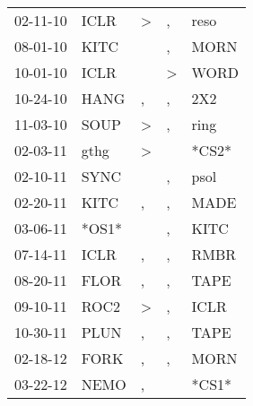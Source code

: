 \begin{supertabular}{p{0.07\textwidth}p{0.06\textwidth}p{0.02\textwidth}p{0.02\textwidth}p{0.06\textwidth}}
          02-11-10\textsuperscript{} &           ICLR\textsuperscript{} &     \textgreater &             , &           reso\textsuperscript{} \\
          08-01-10\textsuperscript{} &           KITC\textsuperscript{} &                  &             , &           MORN\textsuperscript{} \\
          10-01-10\textsuperscript{} &           ICLR\textsuperscript{} &                  &  \textgreater &           WORD\textsuperscript{} \\
          10-24-10\textsuperscript{} &           HANG\textsuperscript{} &                , &             , &            2X2\textsuperscript{} \\
          11-03-10\textsuperscript{} &           SOUP\textsuperscript{} &     \textgreater &             , &           ring\textsuperscript{} \\
          02-03-11\textsuperscript{} &           gthg\textsuperscript{} &     \textgreater &               &                            *CS2* \\
          02-10-11\textsuperscript{} &           SYNC\textsuperscript{} &                  &             , &           psol\textsuperscript{} \\
          02-20-11\textsuperscript{} &           KITC\textsuperscript{} &                , &             , &           MADE\textsuperscript{} \\
          03-06-11\textsuperscript{} &                            *OS1* &                  &             , &           KITC\textsuperscript{} \\
          07-14-11\textsuperscript{} &           ICLR\textsuperscript{} &                , &             , &           RMBR\textsuperscript{} \\
          08-20-11\textsuperscript{} &           FLOR\textsuperscript{} &                , &             , &           TAPE\textsuperscript{} \\
          09-10-11\textsuperscript{} &           ROC2\textsuperscript{} &     \textgreater &             , &           ICLR\textsuperscript{} \\
          10-30-11\textsuperscript{} &           PLUN\textsuperscript{} &                , &             , &           TAPE\textsuperscript{} \\
          02-18-12\textsuperscript{} &           FORK\textsuperscript{} &                , &             , &           MORN\textsuperscript{} \\
          03-22-12\textsuperscript{} &           NEMO\textsuperscript{} &                , &               &                            *CS1* \\

\end{supertabular}
